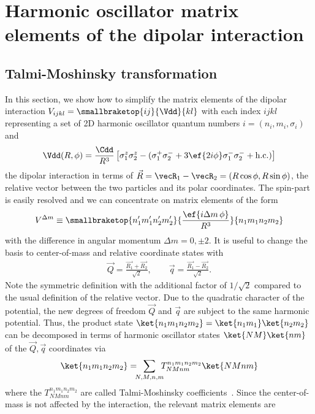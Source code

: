 \chapter{Harmonic oscillator matrix elements of the dipolar interaction}
\label{matrix_elements}

\section{Talmi-Moshinsky transformation}
In this section, we show how to simplify the matrix elements of the dipolar interaction $V_{ijkl}=\smallbraketop{ij}{\Vdd}{kl}$ with each index $ijkl$ representing a set of 2D harmonic oscillator quantum numbers $i=(n_i,m_i,\sigma_i)$ and
\begin{align}
\Vdd(R,\phi) =  \frac{\Cdd}{R^3} \left[
\sigma^z_1 \sigma^z_2 - (\sigma^+_1 \sigma^-_2 +3 \ef{2i\phi} \sigma^-_1 \sigma^-_2  +\text{h.c.})
\right]
\end{align}
the dipolar interaction in terms of $\vec{R}=\vecR_1-\vecR_2=(R\cos \phi, R\sin \phi)$, the relative vector between the two particles and its polar coordinates. The spin-part is easily resolved and we can concentrate on matrix elements of the form
\begin{align}
V^{\Delta m}\equiv\smallbraketop{n_1'm_1'n_2'm_2'}{\frac{\ef{i\Delta m\, \phi}}{R^3}}{n_1m_1n_2m_2}
\end{align}
with the difference in angular momentum $\Delta m = 0, \pm 2$.
It is useful to change the basis to center-of-mass and relative coordinate states with
\begin{align}
    \vec{Q} = \frac{\vec{R_1} + \vec{R_2}}{\sqrt{2}}, \qquad \vec{q} = \frac{\vec{R_1} - \vec{R_2}}{\sqrt{2}}.
\end{align}
Note the symmetric definition with the additional factor of $1/\sqrt{2}$ compared to the usual definition of the relative vector.
Due to the quadratic character of the potential, the new degrees of freedom $\vec{Q}$ and $\vec{q}$ are subject to the same harmonic potential. Thus, the product state $\ket{n_1m_1n_2m_2}=\ket{n_1m_1}\ket{n_2m_2}$ can be decomposed in terms of harmonic oscillator states $\ket{NM}\ket{nm}$ of the $\vec{Q},\vec{q}$ coordinates via
\begin{align}
\ket{n_1m_1n_2m_2} = \!\!\! \sum_{N,M,n,m} \!\!\! T^{n_1m_1n_2m_2}_{NMnm} \ket{NMnm}
\end{align}
where the $T^{n_1m_1n_2m_2}_{NMnm}$ are called Talmi-Moshinsky coefficients~\cite{Moshinsky1959,Talmi1952}. Since the center-of-mass is not affected by the interaction, the relevant matrix elements are
